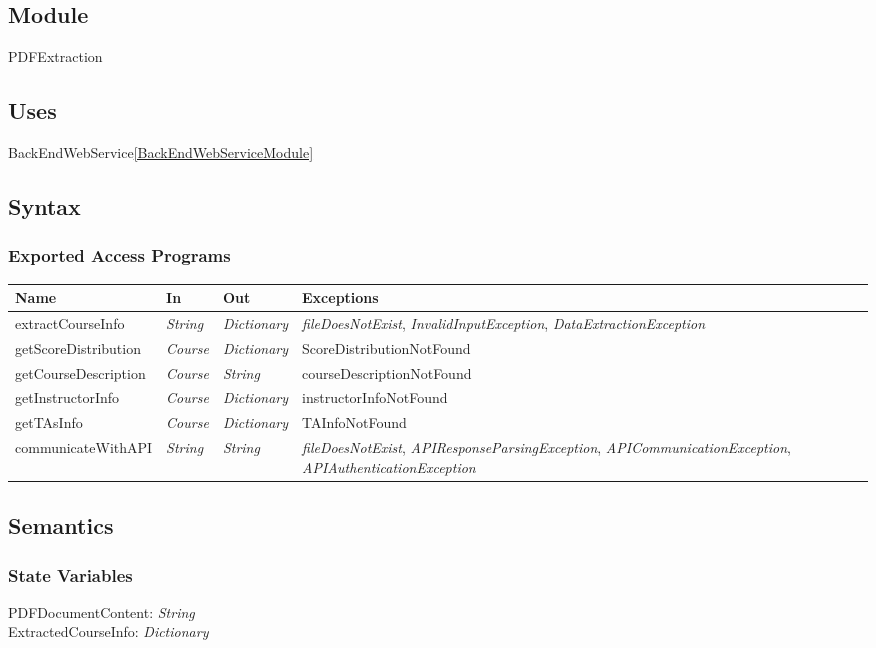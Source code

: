 \documentclass[12pt, titlepage]{article}
\begin{document}
\begin{itemize}
\subsection{Module}
PDFExtraction

\subsection{Uses}
BackEndWebService\ref{BackEndWebServiceModule}

\subsection{Syntax}

\subsubsection{Exported Access Programs}
\begin{center}
\begin{tabular}{p{4cm} p{3cm} p{3cm} p{3cm}}
\hline
\textbf{Name} & \textbf{In} & \textbf{Out} & \textbf{Exceptions} \\
\hline
extractCourseInfo&  \textit{String} & \textit{Dictionary} & \textit{fileDoesNotExist}, \textit{InvalidInputException}, \textit{DataExtractionException} \\
getScoreDistribution&  \textit{Course} & \textit{Dictionary} & ScoreDistributionNotFound \\
getCourseDescription&  \textit{Course} & \textit{String} & courseDescriptionNotFound \\
getInstructorInfo&  \textit{Course} & \textit{Dictionary} & instructorInfoNotFound \\
getTAsInfo&  \textit{Course} & \textit{Dictionary} & TAInfoNotFound \\
communicateWithAPI&  \textit{String} & \textit{String} & \textit{fileDoesNotExist}, \textit{APIResponseParsingException}, \textit{APICommunicationException}, \textit{APIAuthenticationException}\\
\hline
\end{tabular}
\end{center}

\subsection{Semantics}

\subsubsection{State Variables}
PDFDocumentContent: \textit{String}\\
ExtractedCourseInfo: \textit{Dictionary}


\end{itemize}
\end{document}
